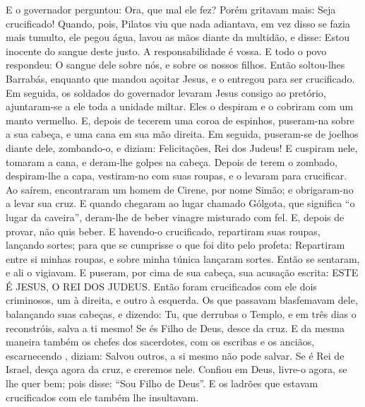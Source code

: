 {  E o governador perguntou: Ora, que mal ele fez? Porém gritavam mais: Seja crucificado!
  Quando, pois, Pilatos viu que nada adiantava, em vez disso se fazia mais tumulto, ele pegou água, lavou as mãos diante da multidão, e disse: Estou inocente do sangue deste justo. A responsabilidade é vossa.
  E todo o povo respondeu: O sangue dele
{} sobre nós, e sobre os nossos filhos.
  Então soltou-lhes Barrabás, enquanto que mandou açoitar Jesus, e o entregou para ser crucificado.
  Em seguida, os soldados do governador levaram Jesus consigo ao pretório, ajuntaram-se a ele toda a unidade miltar.
  Eles o despiram e o cobriram com um manto vermelho.
  E, depois de tecerem uma coroa de espinhos, puseram-na sobre a sua cabeça, e uma cana em sua mão direita. Em seguida, puseram-se de joelhos diante dele, zombando-o, e diziam: Felicitações, Rei dos Judeus!
  E cuspiram nele, tomaram a cana, e deram-lhe golpes na cabeça.
  Depois de terem o zombado, despiram-lhe a capa, vestiram-no com suas roupas, e o levaram para crucificar.
  Ao saírem, encontraram um homem de Cirene, por nome Simão; e obrigaram-no a levar sua cruz.
  E quando chegaram ao lugar chamado Gólgota, que significa “o lugar da caveira”,
  deram-lhe de beber vinagre misturado com fel. E, depois de provar, não quis beber.
  E havendo-o crucificado, repartiram suas roupas, lançando sortes; para que se cumprisse o que foi dito pelo profeta: Repartiram entre si minhas roupas, e sobre minha túnica lançaram sortes.
  Então se sentaram, e ali o vigiavam.
  E puseram, por cima de sua cabeça, sua acusação escrita: ESTE É JESUS, O REI DOS JUDEUS.
  Então foram crucificados com ele dois criminosos,
 um à direita, e outro à esquerda.
  Os que passavam blasfemavam dele, balançando suas cabeças,
  e dizendo: Tu, que derrubas o Templo, e em três dias o reconstróis, salva a ti mesmo! Se és Filho de Deus, desce da cruz.
  E da mesma maneira também os chefes dos sacerdotes, com os escribas e os anciãos, escarnecendo
{}, diziam:
  Salvou outros, a si mesmo não pode salvar. Se é Rei de Israel, desça agora da cruz, e creremos nele.
  Confiou em Deus, livre-o agora, se lhe quer bem; pois disse: “Sou Filho de Deus”.
  E os ladrões que estavam crucificados com ele também lhe insultavam.
}
